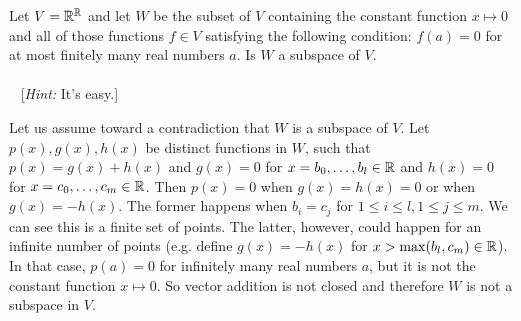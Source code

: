 \begin{problem}[Golan 76]

Let $V = \mathbb{R}^{\mathbb{R}}$ and let $W$ be the subset of $V$ containing the constant
function $x\mapsto 0$ and all of those functions $f \in V$ satisfying the
following condition: $f(a) = 0$ for at most finitely many real numbers $a$.  Is
$W$ a subspace of $V$.\\
\\~
[{\it Hint:} It's easy.]
\end{problem}
\smallskip
\begin{solution}
Let us assume toward a contradiction that $W$ is a subspace of $V$. Let $p(x), g(x), h(x)$ be distinct functions in $W$, such that $p(x) = g(x) + h(x)$ and $g(x) = 0$ for $x = b_0,\dots ,b_l \in \mathbb{R}$ and $h(x) = 0$ for $x = c_0, \dots , c_m \in \mathbb{R}$.  Then $p(x) = 0$ when $g(x) = h(x) = 0$ or when $g(x) = -h(x)$.  The former happens when $b_i = c_j$ for $1 \leq i \leq l, 1 \leq j \leq m$.  We can see this is a finite set of points.  The latter, however, could happen for an infinite number of points (e.g. define $g(x) = -h(x)$ for $x > \max(b_l,c_m) \in \mathbb{R}$). In that case, $p(a) = 0$ for infinitely many real numbers $a$, but it is not the constant function $x \mapsto 0$. So vector addition is not closed and therefore $W$ is not a subspace in $V$.
\end{solution}
\probskip



